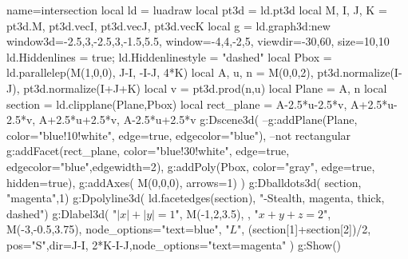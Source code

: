\documentclass{standalone}
\begin{document}
    \begin{luadraw}{name=intersection}
    local ld = luadraw
    local pt3d = ld.pt3d
    local M, I, J, K = pt3d.M, pt3d.vecI, pt3d.vecJ, pt3d.vecK
    local g = ld.graph3d:new{
        window3d={-2.5,3,-2.5,3,-1.5,5.5},
        window={-4,4,-2,5},
        viewdir={-30,60}, size={10,10}
    }
    ld.Hiddenlines = true; ld.Hiddenlinestyle = "dashed"
    local Pbox = ld.parallelep(M(1,0,0), J-I, -I-J, 4*K)
    local A, u, n = M(0,0,2), pt3d.normalize(I-J), pt3d.normalize(I+J+K)    
    local v = pt3d.prod(n,u)
    local Plane = {A, n}
    local section = ld.clipplane(Plane,Pbox)
    local rect_plane = {A-2.5*u-2.5*v, A+2.5*u-2.5*v,  A+2.5*u+2.5*v, A-2.5*u+2.5*v }
    g:Dscene3d(
        --g:addPlane(Plane, {color="blue!10!white", edge=true, edgecolor="blue"}), --not rectangular
        g:addFacet(rect_plane, {color="blue!30!white", edge=true, edgecolor="blue",edgewidth=2}),
        g:addPoly(Pbox, {color="gray", edge=true, hidden=true}),
        g:addAxes( M(0,0,0), {arrows=1})
        )
    g:Dballdots3d( section, "magenta",1)
    g:Dpolyline3d( ld.facetedges({section}), "-Stealth, magenta, thick, dashed")
    g:Dlabel3d(
        "$|x|+|y|=1$", M(-1,2,3.5), {}, 
        "$x+y+z=2$", M(-3,-0.5,3.75), {node_options="text=blue"}, 
        "$L$", (section[1]+section[2])/2, {pos="S",dir={J-I, 2*K-I-J},node_options="text=magenta"}
    )
    g:Show()
    \end{luadraw}
\end{document}
